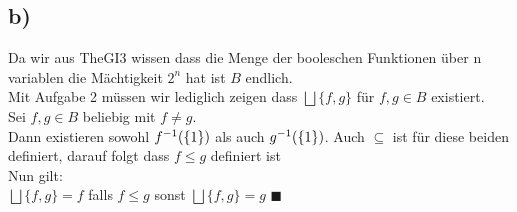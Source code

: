 \subsection*{b)}
Da wir aus TheGI3 wissen dass die Menge der booleschen Funktionen über n variablen die Mächtigkeit $2^n$ hat ist $B$ endlich.\\
Mit Aufgabe 2 müssen wir lediglich zeigen dass $ \bigsqcup \{f,g\}$ für $f,g \in B$ existiert.\\
Sei $f,g \in B$ beliebig mit $f \neq g$. \\
Dann existieren sowohl $f^{-1}(\{1\})$ als auch $g^{-1}(\{1\})$. Auch $\subseteq$ ist für diese beiden definiert, darauf folgt dass $f \leq g$ definiert ist\\
Nun gilt:\\
$ \bigsqcup \{f,g\}= f$ falls $f \leq g$ sonst 
$ \bigsqcup \{f,g\}= g$ $\blacksquare$


